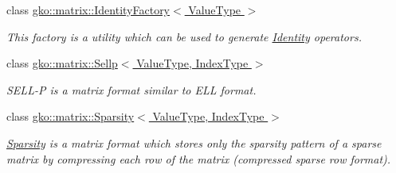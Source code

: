 \begin{DoxyCompactItemize}
class \hyperlink{classgko_1_1matrix_1_1IdentityFactory}{gko\+::matrix\+::\+Identity\+Factory$<$ Value\+Type $>$}
\begin{DoxyCompactList}\small\item\em This factory is a utility which can be used to generate \hyperlink{classgko_1_1matrix_1_1Identity}{Identity} operators. \end{DoxyCompactList}\item 
class \hyperlink{classgko_1_1matrix_1_1Sellp}{gko\+::matrix\+::\+Sellp$<$ Value\+Type, Index\+Type $>$}
\begin{DoxyCompactList}\small\item\em S\+E\+L\+L-\/P is a matrix format similar to E\+LL format. \end{DoxyCompactList}\item 
class \hyperlink{classgko_1_1matrix_1_1Sparsity}{gko\+::matrix\+::\+Sparsity$<$ Value\+Type, Index\+Type $>$}
\begin{DoxyCompactList}\small\item\em \hyperlink{classgko_1_1matrix_1_1Sparsity}{Sparsity} is a matrix format which stores only the sparsity pattern of a sparse matrix by compressing each row of the matrix (compressed sparse row format). \end{DoxyCompactList}\end{DoxyCompactItemize}
